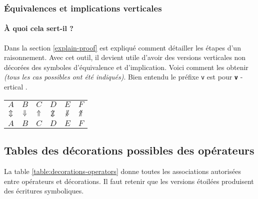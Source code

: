 \documentclass[12pt,a4paper]{article}
\theoremstyle{definition}
\newcommand\whyprefix[2]{%
	\textbf{\prefix{#1}}-#2%
}
\newcommand\prefix[1]{%
	\texttt{#1}%
}
\begin{document}


\subsubsection{Équivalences et implications verticales}

\paragraph{À quoi cela sert-il ?}

Dans la section \ref{explain-proof} est expliqué comment détailler les étapes d'un raisonnement. Avec cet outil, il devient utile d'avoir des versions verticales non décorées des symboles d'équivalence et d'implication. Voici comment les obtenir \emph{(tous les cas possibles ont été indiqués)}.
Bien entendu le préfixe \prefix{v} est pour \whyprefix{v}{ertical}.

\begin{latexex}
\begin{tabular}{cccccc}
  $A$            & $B$
& $C$            & $D$
& $E$            & $F$
\\
  $\mathrel{\Updownarrow}$        & $\mathrel{\Downarrow}$  
& $\mathrel{\Uparrow}$    & $\notviff$
& $\notvimplies$ & $\notvliesimp$
\\
  $A$            & $B$
& $C$            & $D$
& $E$            & $F$
\end{tabular}
\end{latexex}



\subsection{Tables des décorations possibles des opérateurs}

La table \ref{table:decorations-operators}  donne toutes les associations autorisées entre opérateurs et décorations.
Il faut retenir que les versions étoilées produisent des écritures symboliques. 


\end{document}
